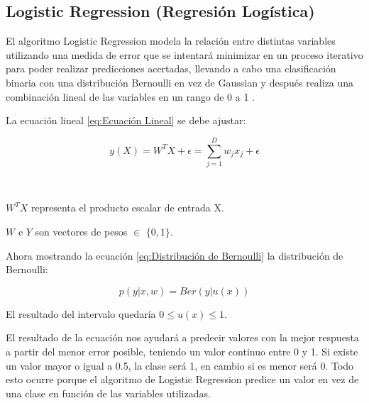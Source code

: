 \subsection{Logistic Regression (Regresión Logística)}
El algoritmo Logistic Regression modela la relación entre distintas variables utilizando una medida de error que se intentará minimizar en un proceso iterativo para poder realizar predicciones acertadas, llevando a cabo una clasificación binaria con una distribución Bernoulli en vez de Gaussian y después realiza una combinación lineal de las variables en un rango de 0 a 1 \cite{ Stoltzfus2011}.\\
\par La ecuación lineal \ref{eq:Ecuación Lineal} se debe ajustar:\\
\begin{Large}
	\begin{equation}
		y(X)=W^{T}X + \epsilon = \sum_{j=1}^{D}w_{j}x_{j} + \epsilon
		\label{eq:Ecuación Lineal}
	\end{equation}
\end{Large}\\ 
\par $W^{T}X$ representa el producto escalar de entrada X.
\par $W$ e $Y$ son vectores de pesos $\in$ $\lbrace 0,1 \rbrace$.\\

\par Ahora mostrando la ecuación \ref{eq:Distribución de Bernoulli} la distribución de Bernoulli:\\
\begin{Large}
	\begin{equation}
		p(y|x,w) = Ber(y|u(x))
		\label{eq:Distribución de Bernoulli}
	\end{equation}
\end{Large}
\begin{center}
	El resultado del intervalo quedaría $0 \leq u(x) \leq 1$.\\
\end{center}
\par El resultado de la ecuación nos ayudará a predecir valores con la mejor respuesta a partir del menor error posible, teniendo un valor continuo entre 0 y 1. Si existe un valor mayor o igual a 0.5, la clase será 1, en cambio si es menor será 0. Todo esto ocurre porque el algoritmo de Logistic Regression predice un valor en vez de una clase en función de las variables utilizadas.\\

